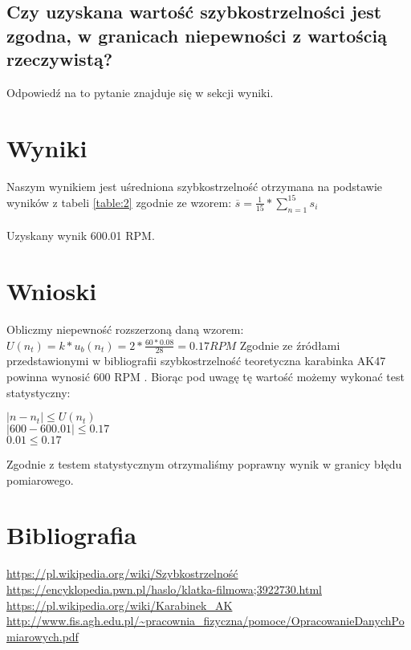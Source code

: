 \documentclass[a4paper,12pt]{article}
\begin{document}
\begin{justify}
\subsection{Czy uzyskana wartość szybkostrzelności jest zgodna, w granicach niepewności z wartością rzeczywistą?}

Odpowiedź na to pytanie znajduje się w sekcji wyniki.

\section{Wyniki}

Naszym wynikiem jest uśredniona szybkostrzelność otrzymana na podstawie wyników z tabeli \ref{table:2} zgodnie ze wzorem:
$\overline{s} = \frac{1}{15} * \sum_{n=1}^{15} s_{i}$  \\ \, \\

Uzyskany wynik 600.01 RPM.

\section{Wnioski}

Obliczmy niepewność rozszerzoną daną wzorem: $U(n_{t}) = k * u_{b}(n_{t}) = 2 * \frac{60 * 0.08}{28} = 0.17 RPM  $
Zgodnie ze źródłami przedstawionymi w bibliografii szybkostrzelność teoretyczna karabinka AK47 powinna wynosić 600 RPM \cite{urlkalach}. Biorąc pod uwagę tę wartość możemy wykonać test statystyczny:
\begin{center}
$| n - n_{t} | \leq U(n_{t}) $ \\
$| 600 - 600.01 | \leq 0.17 $ \\
$0.01 \leq 0.17 $ \\
\end{center}

Zgodnie z testem statystycznym otrzymaliśmy poprawny wynik w granicy błędu pomiarowego.

\section{Bibliografia}

\begingroup
\renewcommand{\section}[2]{}%
\begin{thebibliography}{}
 \url{https://pl.wikipedia.org/wiki/Szybkostrzelność}
 \url{https://encyklopedia.pwn.pl/haslo/klatka-filmowa;3922730.html}
 \url{https://pl.wikipedia.org/wiki/Karabinek_AK}
 \url{http://www.fis.agh.edu.pl/~pracownia_fizyczna/pomoce/OpracowanieDanychPomiarowych.pdf}
\end{thebibliography}
\endgroup

\end{justify}
\end{document}
